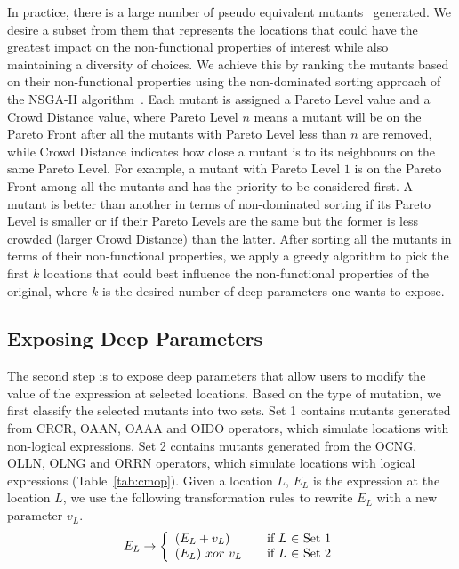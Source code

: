 In practice, there is a large number of pseudo equivalent mutants~\cite{ MikeEQ2015,weimerGPEM14, Yao:2014:SES:2568225.2568265} generated. We desire a subset from them that represents the locations that could have the greatest impact on the non-functional properties of interest while also maintaining a diversity of choices.  
We achieve this by ranking the mutants based on their non-functional properties using the non-dominated sorting approach of the NSGA-II algorithm~\cite{996017}. Each mutant is assigned a Pareto Level value and a Crowd Distance value, where Pareto Level $n$ means a mutant will be on the Pareto Front after all the mutants with Pareto Level less than $n$ are removed, while Crowd Distance indicates how close a mutant is to its neighbours on the same Pareto Level. For example, a mutant with Pareto Level $1$ is on the Pareto Front among all the mutants and has the priority to be considered first. A mutant is better than another in terms of non-dominated sorting if its Pareto Level is smaller or if their Pareto Levels are the same but the former is less crowded (larger Crowd Distance) than the latter. After sorting all the mutants in terms of their non-functional properties, we apply a greedy algorithm to pick the first $k$ locations that could best influence the non-functional properties of the original, where $k$ is the desired number of deep parameters one wants to expose.

\subsection{Exposing Deep Parameters}
\label{exposing}
The second step is to expose deep parameters that allow users to modify the value of the expression at selected locations. Based on the type of mutation, we first classify the selected mutants into two sets. Set 1 contains mutants generated from CRCR, OAAN, OAAA and OIDO operators, which simulate locations with non-logical expressions. Set 2 contains mutants generated from the OCNG, OLLN, OLNG and ORRN operators, which simulate locations with logical expressions (Table~\ref{tab:cmop}). 
Given a location $L$, $E_L$ is the expression at the location $L$, we use the following transformation rules to rewrite $E_L$ with a new parameter $v_L$.
\vspace{-0.2em}
\begin{equation}
 E_L \rightarrow \left\{
  \begin{array}{l l}
    (E_L + v_L) & \quad \text{if $L$ $\in$ Set 1}\\
    (E_L) \ xor \ v_L & \quad \text{if $L$ $\in$ Set 2}
    \end{array} \right.
\end{equation}

